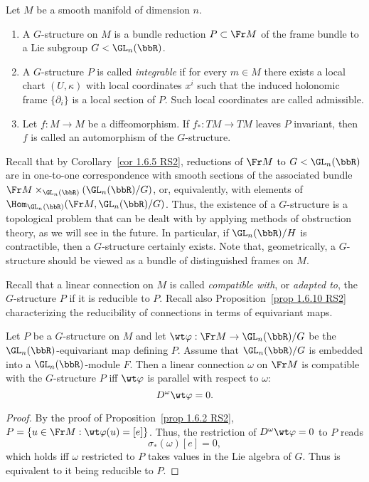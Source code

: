 \begin{defn}
    Let $M$ be a smooth manifold of dimension $n$.
    \begin{enumerate}
        \item A $G$-structure on $M$ is a bundle reduction $P\subset \Fr M$ of the frame bundle to a Lie subgroup $G< \GL_n(\bbR)$.
        \item A $G$-structure $P$ is called \emph{integrable} if for every $m\in M$ there exists a local chart $(U,\kappa)$ with local coordinates $x^i$ such that the induced holonomic frame $\{\partial_i\}$ is a local section of $P$. Such local coordinates are called admissible.
        \item Let $f:M\to M$ be a diffeomorphism. If $f_\ast:TM\to TM$ leaves $P$ invariant, then $f$ is called an automorphism of the $G$-structure.
    \end{enumerate}
\end{defn}

Recall that by Corollary~\ref{cor 1.6.5 RS2}, reductions of $\Fr M$ to $G<\GL_n(\bbR)$ are in one-to-one correspondence with smooth sections of the associated bundle $\Fr M\times_{\GL_n(\bbR)}(\GL_n(\bbR)\slash G)$, or, equivalently, with elements of $\Hom_{\GL_n(\bbR)}(\Fr M,\GL_n(\bbR)\slash G)$. Thus, the existence of a $G$-structure is a topological problem that can be dealt with by applying methods of obstruction theory, as we will see in the future. In particular, if $\GL_n(\bbR)\slash H$ is contractible, then a $G$-structure certainly exists. Note that, geometrically, a $G$-structure should be viewed as a bundle of distinguished frames on $M$.

Recall that a linear connection on $M$ is called \emph{compatible with}, or \emph{adapted to}, the $G$-structure $P$ if it is reducible to $P$. Recall also Proposition~\ref{prop 1.6.10 RS2} characterizing the reducibility of connections in terms of equivariant maps.

\begin{prop}[{{\cite[Prop.~2.2.3]{RS2}}}]\label{prop 2.2.3 RS2}
    Let $P$ be a $G$-structure on $M$ and let $\wt\varphi:\Fr M\to \GL_n(\bbR)\slash G$ be the $\GL_n(\bbR)$-equivariant map defining $P$. Assume that $\GL_n(\bbR)\slash G$ is embedded into a $\GL_n(\bbR)$-module $F$. Then a linear connection $\omega$ on $\Fr M$ is compatible with the $G$-structure $P$ iff $\wt\varphi$ is parallel with respect to $\omega$:
    \[D^\omega\wt\varphi=0.\]
\end{prop}
\begin{proof}
    By the proof of Proposition~\ref{prop 1.6.2 RS2}, $P=\{u\in \Fr M:\wt\varphi(u)=[e]\}$. Thus, the restriction of $D^\omega\wt\varphi=0$ to $P$ reads 
    \[\sigma_\ast(\omega)[e]=0,\]
    which holds iff $\omega$ restricted to $P$ takes values in the Lie algebra of $G$. Thus is equivalent to it being reducible to $P$.
\end{proof}

